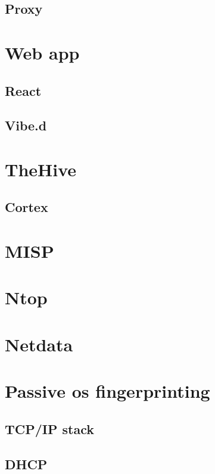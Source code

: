 \documentclass[a4paper,12pt]{report}
\begin{document}
\subsection{Proxy}

\section{Web app}
\subsection{React}
\subsection{Vibe.d}

\section{TheHive}
\subsection{Cortex}
\section{MISP}
\section{Ntop}
\section{Netdata}

\section{Passive os fingerprinting}
\subsection{TCP/IP stack}
\subsection{DHCP}
\end{document}
